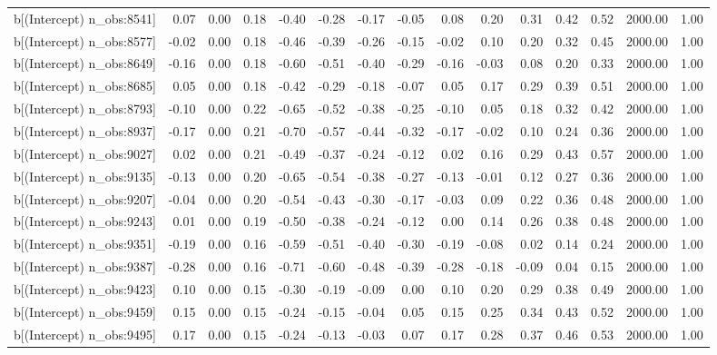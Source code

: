 \begin{table}[ht]
\begin{tabular}{rrrrrrrrrrrrrrr}
  b[(Intercept) n\_obs:8541] & 0.07 & 0.00 & 0.18 & -0.40 & -0.28 & -0.17 & -0.05 & 0.08 & 0.20 & 0.31 & 0.42 & 0.52 & 2000.00 & 1.00 \\ 
  b[(Intercept) n\_obs:8577] & -0.02 & 0.00 & 0.18 & -0.46 & -0.39 & -0.26 & -0.15 & -0.02 & 0.10 & 0.20 & 0.32 & 0.45 & 2000.00 & 1.00 \\ 
  b[(Intercept) n\_obs:8649] & -0.16 & 0.00 & 0.18 & -0.60 & -0.51 & -0.40 & -0.29 & -0.16 & -0.03 & 0.08 & 0.20 & 0.33 & 2000.00 & 1.00 \\ 
  b[(Intercept) n\_obs:8685] & 0.05 & 0.00 & 0.18 & -0.42 & -0.29 & -0.18 & -0.07 & 0.05 & 0.17 & 0.29 & 0.39 & 0.51 & 2000.00 & 1.00 \\ 
  b[(Intercept) n\_obs:8793] & -0.10 & 0.00 & 0.22 & -0.65 & -0.52 & -0.38 & -0.25 & -0.10 & 0.05 & 0.18 & 0.32 & 0.42 & 2000.00 & 1.00 \\ 
  b[(Intercept) n\_obs:8937] & -0.17 & 0.00 & 0.21 & -0.70 & -0.57 & -0.44 & -0.32 & -0.17 & -0.02 & 0.10 & 0.24 & 0.36 & 2000.00 & 1.00 \\ 
  b[(Intercept) n\_obs:9027] & 0.02 & 0.00 & 0.21 & -0.49 & -0.37 & -0.24 & -0.12 & 0.02 & 0.16 & 0.29 & 0.43 & 0.57 & 2000.00 & 1.00 \\ 
  b[(Intercept) n\_obs:9135] & -0.13 & 0.00 & 0.20 & -0.65 & -0.54 & -0.38 & -0.27 & -0.13 & -0.01 & 0.12 & 0.27 & 0.36 & 2000.00 & 1.00 \\ 
  b[(Intercept) n\_obs:9207] & -0.04 & 0.00 & 0.20 & -0.54 & -0.43 & -0.30 & -0.17 & -0.03 & 0.09 & 0.22 & 0.36 & 0.48 & 2000.00 & 1.00 \\ 
  b[(Intercept) n\_obs:9243] & 0.01 & 0.00 & 0.19 & -0.50 & -0.38 & -0.24 & -0.12 & 0.00 & 0.14 & 0.26 & 0.38 & 0.48 & 2000.00 & 1.00 \\ 
  b[(Intercept) n\_obs:9351] & -0.19 & 0.00 & 0.16 & -0.59 & -0.51 & -0.40 & -0.30 & -0.19 & -0.08 & 0.02 & 0.14 & 0.24 & 2000.00 & 1.00 \\ 
  b[(Intercept) n\_obs:9387] & -0.28 & 0.00 & 0.16 & -0.71 & -0.60 & -0.48 & -0.39 & -0.28 & -0.18 & -0.09 & 0.04 & 0.15 & 2000.00 & 1.00 \\ 
  b[(Intercept) n\_obs:9423] & 0.10 & 0.00 & 0.15 & -0.30 & -0.19 & -0.09 & 0.00 & 0.10 & 0.20 & 0.29 & 0.38 & 0.49 & 2000.00 & 1.00 \\ 
  b[(Intercept) n\_obs:9459] & 0.15 & 0.00 & 0.15 & -0.24 & -0.15 & -0.04 & 0.05 & 0.15 & 0.25 & 0.34 & 0.43 & 0.52 & 2000.00 & 1.00 \\ 
  b[(Intercept) n\_obs:9495] & 0.17 & 0.00 & 0.15 & -0.24 & -0.13 & -0.03 & 0.07 & 0.17 & 0.28 & 0.37 & 0.46 & 0.53 & 2000.00 & 1.00 \\ 

\end{tabular}
\end{table}
